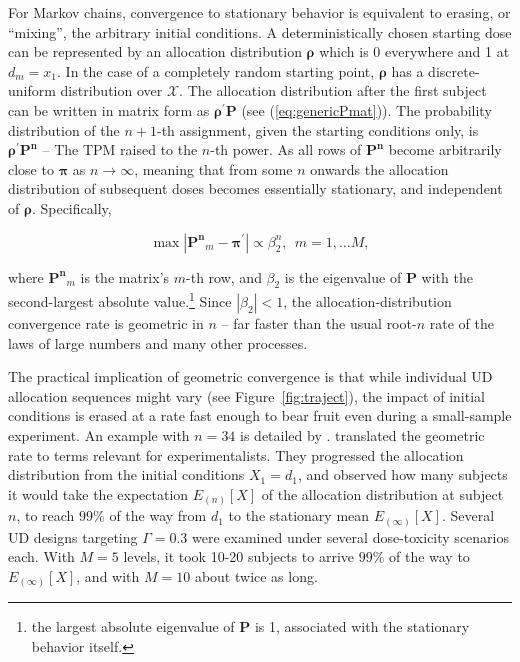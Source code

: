 For Markov chains, convergence to stationary behavior is equivalent to erasing, or ``mixing'', the arbitrary initial conditions. A deterministically chosen starting dose can be represented by an allocation distribution $\boldsymbol{\rho}$ which is 0 everywhere and 1 at $d_m=x_1$. In the case of a completely random starting point, $\boldsymbol{\rho}$ has a discrete-uniform distribution over $\mathcal{X}$. The allocation distribution after the first subject can be written in matrix form as $\boldsymbol{\rho}^{'}\mathbf{P}$ (see (\ref{eq:genericPmat})). The probability distribution of the $n+1$-th assignment, given the starting conditions only, is $\boldsymbol{\rho}^{'}\mathbf{P^n}$ -- The TPM raised to the $n$-th power. \citep{Diac:Stro:geom:1991} As all rows of $\mathbf{P^n}$ become arbitrarily close to $\boldsymbol{\pi}$ as $n\to\infty$, meaning that from some $n$ onwards the allocation distribution of subsequent doses becomes essentially stationary, and independent of $\boldsymbol{\rho}$. Specifically,

\begin{equation}\label{eq:diac}
\max\left|\mathbf{P^n}_{m}-\boldsymbol{\pi}^\prime\right|\propto\beta_2^n,\ \ m=1,\ldots M,
\end{equation}

\noindent where $\mathbf{P^n}_{m}$ is the matrix's $m$-th row, and $\beta_2$ is the eigenvalue of $\mathbf{P}$ with the second-largest absolute value.\footnote{
the largest absolute eigenvalue of $\mathbf{P}$ is 1, associated with the stationary behavior itself.} Since $\left|\beta_2\right|<1$, the allocation-distribution convergence rate is geometric in $n$ --  far faster than the usual root-$n$ rate of the laws of large numbers and many other processes.

The practical implication of geometric convergence is that while individual UD allocation sequences might vary (see Figure~\ref{fig:traject}), the impact of initial conditions is erased at a rate fast enough to bear fruit even during a small-sample experiment. An example with $n=34$ is detailed by
\citep{Durh:Flou:Rose:rand:1997}. \citep{Oron:Hoff:thek:2009} translated the geometric rate to terms relevant for experimentalists. They progressed the allocation distribution from the initial conditions $X_1=d_1$, and observed how many subjects it would take the expectation $E_{(n)}[X]$ of the allocation distribution at subject $n$,  to reach $99\%$ of the way from $d_1$ to the stationary mean $E_{(\infty)}[X]$. Several UD designs targeting $\Gamma=0.3$ were examined under several dose-toxicity scenarios each. With $M=5$ levels, it took 10-20 subjects to arrive $99\%$ of the way to $E_{(\infty)}[X]$, and with $M=10$ about twice as long.


